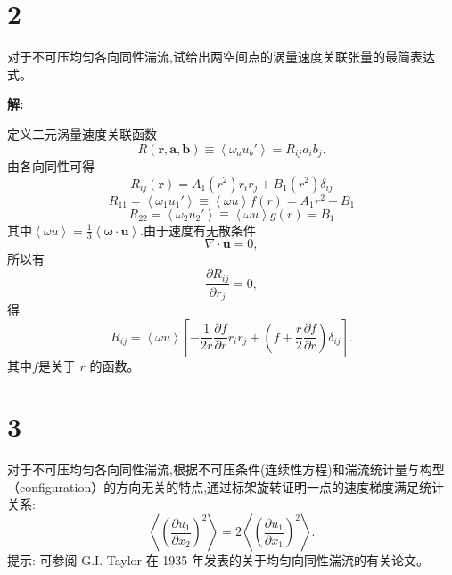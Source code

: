 \documentclass[12pt,a4]{ctexart}
\begin{document}
\section{2}
对于不可压均匀各向同性湍流,试给出两空间点的涡量速度关联张量的最简表达式。

\textsf{\hspace{-2em}\sf  \textbf{解:}}

定义二元涡量速度关联函数
\begin{equation}
   R ( \bm{r}, \bm{a} , \bm{b}  ) \equiv \left< \omega_{a} u_{b}' \right> = R_{ij} a_i b_j.
\end{equation}
由各向同性可得
\begin{equation}
   R_{ij}(\bm{r}) = A_1(r^2) r_i r_j + B_1(r^2) \delta_{ij}
\end{equation}
\begin{equation}
   R_{11} = \left< \omega_1 u_1' \right> \equiv \left< \omega u \right> f(r) = A_1 r^2 + B_1
\end{equation}
\begin{equation}
   R_{22} = \left< \omega_2 u_2' \right> \equiv \left< \omega u \right> g(r) = B_1
\end{equation}
其中$\left< \omega u \right> = \frac{1}{3} \left< \bm{\omega} \cdot \bm{u}\right>$.由于速度有无散条件
\begin{equation}
   \nabla \cdot \bm{u} = 0,
\end{equation}
所以有
\begin{equation}
   \frac{\partial R_{ij}}{\partial r_j} = 0,
\end{equation}
得
\begin{equation}
   R_{ij} = \left< \omega u \right> \left[ - \frac{1}{2r} \frac{\partial f}{\partial r} r_{i} r_{j} + \left( f + \frac{r}{2} \frac{\partial f}{\partial r} \right) \delta_{ij} \right] .
\end{equation}
其中$f$是关于 $r$ 的函数。


\section{3}
对于不可压均匀各向同性湍流,根据不可压条件(连续性方程)和湍流统计量与构型（configuration）的方向无关的特点,通过标架旋转证明一点的速度梯度满足统计关系:
\begin{equation}
   \left\langle\left(\frac{\partial u_{1}}{\partial x_{2}}\right)^{2}\right\rangle=2\left\langle\left(\frac{\partial u_{1}}{\partial x_{1}}\right)^{2}\right\rangle.
\end{equation}
提示: 可参阅 G.I. Taylor 在 1935 年发表的关于均匀向同性湍流的有关论文。
\end{document}
